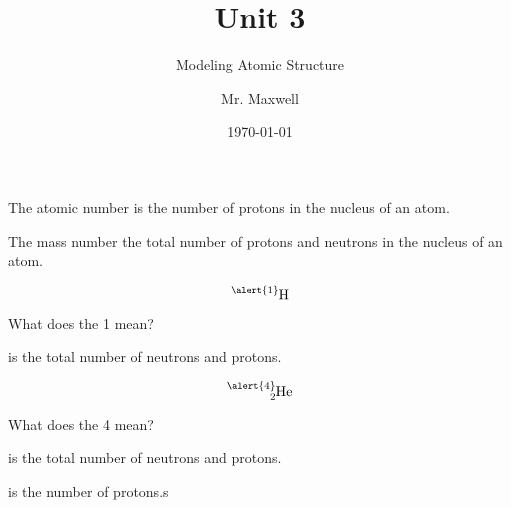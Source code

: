 \documentclass{beamer}
\title{Unit 3}
\subtitle{Modeling Atomic Structure}
\author{Mr. Maxwell}
\institute{PACS}
\date{\today}
\begin{document}
\frame{\titlepage}


\begin{frame}
\onslide The 
 \pause \alert{atomic number}
 \onslide is the number of 
 \pause \alert{protons} 
 \onslide in the nucleus of an atom.
\end{frame}


\begin{frame}
    \onslide The 
     \pause \alert{mass number}
     \onslide the total number of
     \pause \alert{protons} 
     \onslide and
     \pause \alert{neutrons} 
     \onslide in the nucleus of an atom.
    \end{frame}

\begin{frame}
    $$\ce{^{\alert{1}}_{}H}$$

    \pause What does the \alert{1} mean?

     is the total number of neutrons and protons.
\end{frame}


\begin{frame}
    $$\ce{^{\alert{4}}_{2}He}$$

    \pause What does the \alert{4} mean?

     is the total number of neutrons and protons.

     is the number of protons.s
\end{frame}
\end{document}
